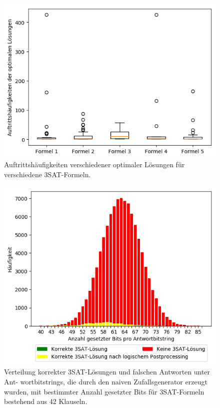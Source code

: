 \begin{figure}
\centering
\includegraphics[width=.8\textwidth]{../material_2/25_clauses__4_2_def_MISBIAS.png}
\caption{Auftrittshäufigkeiten verschiedener optimaler Lösungen für verschiedene 3SAT-Formeln.} \label{fig:distr}
\end{figure}

\begin{figure}
\centering
\includegraphics[width=.8\textwidth]{../material_2/42_clauses__0_2_def_RANDOM_color_transformed.png}%
\caption{Verteilung korrekter 3SAT-Lösungen und falschen Antworten unter Ant- wortbitstrings, die durch den naiven Zufallsgenerator erzeugt wurden, mit bestimmter Anzahl gesetzter Bits für 3SAT-Formeln bestehend aus 42 Klauseln.} \label{fig:distr}
\end{figure}

